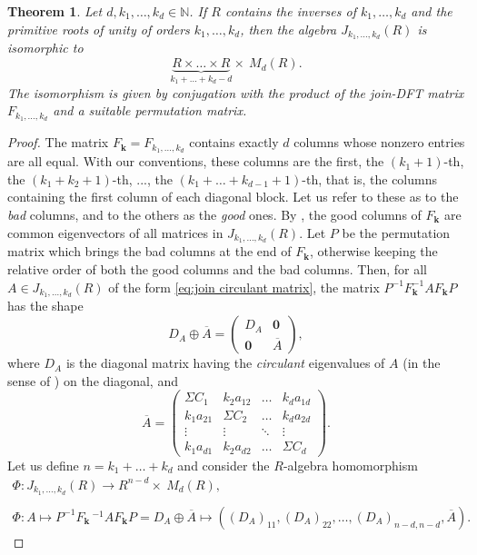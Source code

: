 \documentclass[12pt, a4paper]{amsart}
\numberwithin{equation}{section} %
\theoremstyle{plain}
\newtheorem{thm}{Theorem}[section]
\theoremstyle{definition}
\theoremstyle{plain}
\theoremstyle{remark}
\newcommand{\N}{\mathbb{N}}
\begin{document}
\begin{thm}\label{thm:Artin-Wedderburn}
Let $d,k_1,\dots,k_d\in\N$. If $R$ contains the inverses of $k_1,\dots,k_d$ and the primitive roots of unity of orders $k_1,\dots,k_d$, then the algebra $J_{k_1,\dots,k_d}(R)$ is isomorphic to \[\underbrace{R\times\dots\times R}_{\text{$k_1+\dots+k_d-d$}}\times\ M_d(R).\] The isomorphism is given by conjugation with the product of the join-DFT matrix $F_{k_1,\dots,k_d}$ and a suitable permutation matrix.
\end{thm}
\begin{proof}
The matrix $F_{\mathbf{k}}=F_{k_1,\dots,k_d}$ contains exactly $d$ columns whose nonzero entries are all equal. With our conventions, these columns are the first, the $(k_1+1)$-th, the $(k_1+k_2+1)$-th, ..., the $(k_1+\dots+k_{d-1}+1)$-th, that is, the columns containing the first column of each diagonal block. Let us refer to these as to the \textit{bad} columns, and to the others as the \textit{good} ones.
By \cite[Theorem 1]{CM1}, the good columns of $F_\mathbf{k}$ are common eigenvectors of all matrices in $J_{k_1,\dots,k_d}(R)$.
Let $P$ be the permutation matrix which brings the bad columns at the end of $F_\mathbf{k}$, otherwise keeping the relative order of both the good columns and the bad columns. Then, for all $A\in J_{k_1,\dots,k_d}(R)$ of the form \eqref{eq:join circulant matrix}, the matrix $P^{-1}F_\mathbf{k}^{-1}AF_\mathbf{k}P$ has the shape
\[D_A\oplus \overline{A}=
\left(\begin{array}{c|c}
    D_A & \mathbf{0} \\
    \hline
    \mathbf{0}  & \overline{A}
\end{array}\right),
\]
where $D_A$ is the diagonal matrix having the \textit{circulant} eigenvalues of $A$ (in the sense of \cite[Definition 1]{CM1}) on the diagonal, and
\[
\overline{A}=
\begin{pmatrix}
\Sigma C_1 & k_2a_{12} & \dots & k_da_{1d}\\
k_1a_{21} & \Sigma C_2 & \dots & k_da_{2d}\\
\vdots & \vdots & \ddots & \vdots\\
k_1a_{d1} & k_2a_{d2} & \dots & \Sigma C_d
\end{pmatrix}.
\]
Let us define $n=k_1+\dots+k_d$ and consider the $R$-algebra homomorphism
\begin{equation}\label{eq:Artin-Wedderburn decomp}
    \begin{array}{c}
    \Phi:J_{k_1,\dots,k_d}(R)\to R^{n-d}\times\ M_d(R),\\\\
    \Phi: A\mapsto P^{-1}F_{\mathbf{k}}\,\! ^{-1}AF_\mathbf{k}P=D_A\oplus\overline{A}\mapsto \left((D_A)_{11},(D_A)_{22},\dots,(D_A)_{n-d,n-d},\overline{A}\right).
    \end{array}
\end{equation}


\end{proof}
\end{document}
